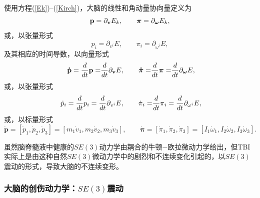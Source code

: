 \documentclass[11pt,fontset=founder]{ctexart}
\begin{document}
使用方程(\ref{Ek})--(\ref{Kirch})，大脑的线性和角动量协向量定义为
\begin{equation*}
\mathbf{p}=\partial _{\mathbf{v}}E_{k}{,\qquad \mathbf{\pi }=\partial _{%
\mathbf{\omega }}E_{k},}
\end{equation*}
或，以张量形式
\begin{equation*}
p_{i}=\partial _{v^{i}}E{,\qquad }\pi _{i}=\partial _{{\omega }^{i}}E,
\end{equation*}
及其相应的时间导数，以向量形式
\begin{equation*}
~\boldsymbol{\dot{\mathbf p}}=\frac{d}{dt}\mathbf{p=}\frac{d}{dt}\partial _{\mathbf{v}}E{%
,\qquad \boldsymbol{\dot{\pi}}=}\frac{d}{dt}\mathbf{\pi =}\frac{d}{dt}\partial _{%
\mathbf{\omega }}E,
\end{equation*}
或，以张量形式
\begin{equation*}
~\dot{p}_{i}=\frac{d}{dt}p_{i}=\frac{d}{dt}\partial _{v^{i}}E{,\qquad \dot{%
\pi}_{i}=}\frac{d}{dt}\pi _{i}=\frac{d}{dt}\partial _{{\omega }^{i}}E,
\end{equation*}
或，以标量形式
\begin{equation*}
\boldsymbol{\dot{\mathbf p}}=[\dot{p}_{1},\dot{p}_{2},\dot{p}_{3}]=[m_{1}\dot{v}%
_{1},m_{2}\dot{v}_{2},m_{3}\dot{v}_{3}],\qquad {\boldsymbol{\dot{\pi}}}=[\dot{\pi%
}_{1},\dot{\pi}_{2},\dot{\pi}_{3}]=[I_{1}\dot{\omega}_{1},I_{2}\dot{\omega}%
_{2},I_{3}\dot{\omega}_{3}].
\end{equation*}

虽然脑脊髓液中健康的$SE(3)$动力学由耦合的牛顿−欧拉微动力学给出，但TBI实际上是由这种自然$SE(3)$微动力学中的剧烈和不连续变化引起的，以$SE(3)$震动的形式，导致大脑的不连续变形。


\subsubsection{大脑的创伤动力学：$SE(3)$震动}
\end{document}

